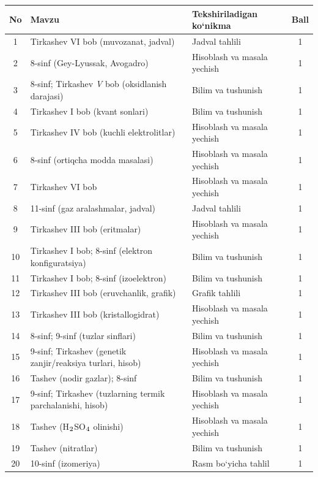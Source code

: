 \documentclass[11pt,a4paper]{article}
\renewcommand{\textsubscript}[1]{\ensuremath{_{\text{\fontsize{8}{8}\selectfont #1}}}}
\begin{document}
{\small\noindent\begin{longtable}{|c|p{7.2cm}|p{5.4cm}|c|}\hline \textbf{No} & \textbf{Mavzu} & \textbf{Tekshiriladigan ko`nikma} & \textbf{Ball}\\\hline
1 & Tirkashev VI bob (muvozanat, jadval) & Jadval tahlili & 1\\\hline
2 & 8-sinf (Gey-Lyussak, Avogadro) & Hisoblash va masala yechish & 1\\\hline
3 & 8-sinf; Tirkashev \textit{V} bob (oksidlanish darajasi) & Bilim va tushunish & 1\\\hline
4 & Tirkashev I bob (kvant sonlari) & Bilim va tushunish & 1\\\hline
5 & Tirkashev IV bob (kuchli elektrolitlar) & Hisoblash va masala yechish & 1\\\hline
6 & 8-sinf (ortiqcha modda masalasi) & Hisoblash va masala yechish & 1\\\hline
7 & Tirkashev VI bob & Hisoblash va masala yechish & 1\\\hline
8 & 11-sinf (gaz aralashmalar, jadval) & Jadval tahlili & 1\\\hline
9 & Tirkashev III bob (eritmalar) & Hisoblash va masala yechish & 1\\\hline
10 & Tirkashev I bob; 8-sinf (elektron konfiguratsiya) & Bilim va tushunish & 1\\\hline
11 & Tirkashev I bob; 8-sinf (izoelektron) & Bilim va tushunish & 1\\\hline
12 & Tirkashev III bob (eruvchanlik, grafik) & Grafik tahlili & 1\\\hline
13 & Tirkashev III bob (kristallogidrat) & Hisoblash va masala yechish & 1\\\hline
14 & 8-sinf; 9-sinf (tuzlar sinflari) & Bilim va tushunish & 1\\\hline
15 & 9-sinf; Tirkashev (genetik zanjir/reaksiya turlari, hisob) & Hisoblash va masala yechish & 1\\\hline
16 & Tashev (nodir gazlar); 8-sinf & Bilim va tushunish & 1\\\hline
17 & 9-sinf; Tirkashev (tuzlarning termik parchalanishi, hisob) & Hisoblash va masala yechish & 1\\\hline
18 & Tashev (H\textsubscript{2}SO\textsubscript{4} olinishi) & Hisoblash va masala yechish & 1\\\hline
19 & Tashev (nitratlar) & Bilim va tushunish & 1\\\hline
20 & 10-sinf (izomeriya) & Rasm bo`yicha tahlil & 1\\\hline

\end{longtable}}
\end{document}

